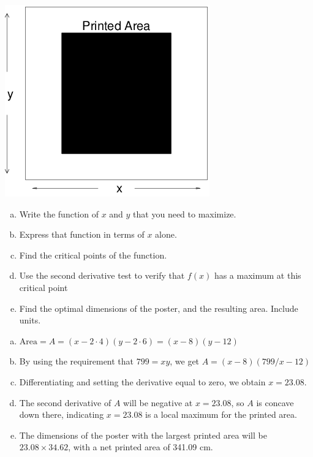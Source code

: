 \begin{enumerate}[1.]
\begin{multicols}{2}
\begin{Question}
\includegraphics[width=0.7\linewidth]{graphics/Week03_OptimizationWordProblems/Poster}

\begin{enumerate}[(a)]
\item Write the function of $x$ and $y$ that you need to maximize.
\item Express that function in terms of $x$ alone. 
\item Find the critical points of the function. 
\item Use the second derivative test to verify that \(f(x)\) has a maximum at this critical point 
\item Find the optimal dimensions of the poster, and the resulting area.  Include units.
\end{enumerate}
\par\end{Question}
\begin{Solution}
  \begin{enumerate}[(a)]

\item $\mbox{Area} = A = (x-2\cdot 4 )(y - 2\cdot 6)= (x - 8)(y - 12)$
\item By using the requirement that $799 = x y$, we get  $A = (x - 8)(799/x - 12)$
\item Differentiating and setting the derivative equal to zero, we obtain $x = 23.08$.
\item The second derivative of $A$ will be negative at $x = 23.08$, so
  $A$ is concave down there, indicating $x=23.08$ is a local maximum for the printed area.
\item The dimensions of the poster with the largest printed area will be
$23.08 \times 34.62$, with a net printed area of 341.09 cm.
  \end{enumerate}


\end{Solution}
\end{multicols}
\end{enumerate}

